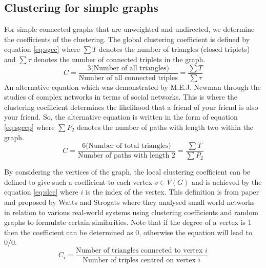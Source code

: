 \subsection{Clustering for simple graphs}
For simple connected graphs that are unweighted and undirected, we determine the coefficients of the clustering. The global clustering coefficient is defined by equation \ref{eq:sgcc} where $\sum{T}$ denotes the number of triangles (closed triplets) and $\sum{\tau}$ denotes the number of connected triplets in the graph.
\begin{equation} \label{eq:sgcc}
C = \frac{3\text{(Number of all triangles)}}{\text{Number of all connected triples}} = \frac{\sum{T}}{\sum{\tau}}
\end{equation}
An alternative equation which was demonstrated by M.E.J. Newman \cite{Newman_2003} through the studies of complex networks in terms of social networks. This is where the clustering coefficient determines the likelihood that a friend of your friend is also your friend. So, the alternative equation is written in the form of equation \ref{eq:sgccp} where $\sum{P_2}$ denotes the number of paths with length two within the graph.
\begin{equation} \label{eq:sgccp}
C = \frac{6\text{(Number of total triangles)}}{\text{Number of paths with length 2}} = \frac{\sum{T}}{\sum{P_2}}
\end{equation}

By considering the vertices of the graph, the local clustering coefficient can be defined to give such a coefficient to each vertex $v\in V(G)$ and is achieved by the equation \ref{eq:slcc} where $i$ is the index of the vertex. This definition is from paper \cite{Newman_2003} and proposed by Watts and Strogats \cite{Watts1998} where they analysed small world networks in relation to various real-world systems using clustering coefficients and random graphs to formulate certain similarities. Note that if the degree of a vertex is 1 then the coefficient can be determined as 0, otherwise the equation will lead to $0/0$.
\begin{equation} \label{eq:slcc}
C_i = \frac{\text{Number of triangles connected to vertex $i$}}{\text{Number of triples centred on vertex $i$}}
\end{equation}

